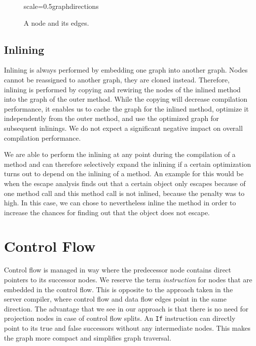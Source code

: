 \documentclass[twocolumn]{svjour3}
\begin{document}
\begin{figure}[h]
  \centering
\begin{digraphenv}{scale=0.5}{graphdirections}
\end{digraphenv}
  \caption{A node and its edges.}
  \label{fig:directions}
\end{figure}

\subsection{Inlining}
Inlining is always performed by embedding one graph into another graph.
Nodes cannot be reassigned to another graph, they are cloned instead.
Therefore, inlining is performed by copying and rewiring the nodes of the inlined method into the graph of the outer method.
While the copying will decrease compilation performance, it enables us to cache the graph for the inlined method, optimize it independently from the outer method, and use the optimized graph for subsequent inlinings.
We do not expect a significant negative impact on overall compilation performance.

We are able to perform the inlining at any point during the compilation of a method and can therefore selectively expand the inlining if a certain optimization turns out to depend on the inlining of a method.
An example for this would be when the escape analysis finds out that a certain object only escapes because of one method call and this method call is not inlined, because the penalty was to high.
In this case, we can chose to nevertheless inline the method in order to increase the chances for finding out that the object does not escape.

\section{Control Flow}

Control flow is managed in way where the predecessor node contains direct pointers to its successor nodes.
We reserve the term \textit{instruction} for nodes that are embedded in the control flow.
This is opposite to the approach taken in the server compiler, where control flow and data flow edges point in the same direction.
The advantage that we see in our approach is that there is no need for projection nodes in case of control flow splits.
An \texttt{If} instruction can directly point to its true and false successors without any intermediate nodes.
This makes the graph more compact and simplifies graph traversal.
\end{document}
